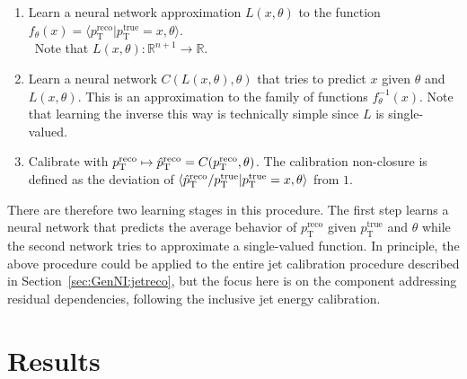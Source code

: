 \begin{enumerate}
  \item Learn a neural network approximation $L(x,\theta)$ to the function $f_\theta(x)=\langle p_\text{T}^\text{reco}|p_\text{T}^\text{true}=x,\theta\rangle$.  \\\ Note that $L(x,\theta):\mathbb{R}^{n+1}\rightarrow\mathbb{R}$.
\item Learn a neural network $C(L(x,\theta),\theta)$ that tries to predict $x$ given $\theta$ and $L(x,\theta)$.  This is an approximation to the family of functions $f^{-1}_\theta(x)$.  Note that learning the inverse this way is technically simple since $L$ is single-valued.
\item Calibrate with $p_\text{T}^\text{reco} \mapsto \hat{p}_\text{T}^\text{reco} = C(p_\text{T}^\text{reco},\theta)$.  The calibration non-closure is defined as the deviation of $\langle \hat{p}_\text{T}^\text{reco}/p_\text{T}^\text{true} | p_\text{T}^\text{true}=x,\theta\rangle$ from $1$.
\end{enumerate}

There are therefore two learning stages in this procedure.  The first step learns a neural network that predicts the average behavior of $p_\text{T}^\text{reco}$ given $p_\text{T}^\text{true}$ and $\theta$ while the second network tries to approximate a single-valued function.  In principle, the above procedure could be applied to the entire jet calibration procedure described in Section~\ref{sec:GenNI:jetreco}, but the focus here is on the component addressing residual dependencies, following the inclusive jet energy calibration.

\section{Results}
\label{sec:GenNI:results}

